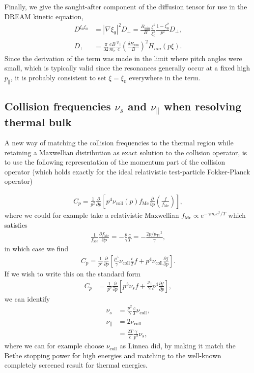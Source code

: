 \documentclass[11pt,a4paper]{article}
\newcommand{\sub}[1]{\ensuremath{_{\text{#1}}}}
\begin{document}
Finally, we give the saught-after component of the diffusion tensor for use in the DREAM kinetic equation,
\begin{align}
D^{\xi_0 \xi_0} &= |\nabla \xi_0|^2 D_\perp = \frac{B\sub{min}}{B}\frac{\xi^2}{\xi_0^2} \frac{1-\xi_0^2}{p^2} D_\perp, \nonumber \\
D_\perp &= \frac{\pi}{32}\frac{ eB}{m_e}\frac{v_\parallel}{c} \left(\frac{\delta B_{nm}}{B}\right)^2 H_{nm}(p\xi).
\end{align}
Since the derivation of the term was made in the limit where pitch angles were small, which is typically valid since the resonances generally occur at a fixed high $p_\parallel$, it is probably consistent to set $\xi=\xi_0$ everywhere in the term.


\subsection{Collision frequencies $\nu_s$ and $\nu_\parallel$ when resolving thermal bulk}
A new way of matching the collision frequencies to the thermal region while retaining a Maxwellian distribution as exact solution to the collision operator, is to use the following representation of the momentum part of the collision operator (which holds exactly for the ideal relativistic test-particle Fokker-Planck operator)

\begin{align}
C_p = \frac{1}{p^2}\frac{\partial}{\partial p} \left[ p^4 \nu\sub{coll}(p) f\sub{Me}\frac{\partial}{\partial p}\left(\frac{f}{f\sub{Me}}\right)\right],
\end{align}
where we could for example take a relativistic Maxwellian $f\sub{Me}\propto e^{-\gamma  m_e c^2/T}$ which satisfies 
\begin{align}
\frac{1}{f\sub{Me}}\frac{\partial f\sub{Me}}{\partial p} = -\frac{p}{\gamma}\frac{c}{T} = -\frac{2 p/p\sub{Te}^2}{\gamma}, 
\end{align}
in which case we find
\begin{align}
C_p = \frac{1}{p^2}\frac{\partial}{\partial p} \left[ \frac{p^5}{\gamma}\nu\sub{coll} \frac{c}{T} f  + p^4 \nu\sub{coll} \frac{\partial f}{\partial p}\right].
\end{align}
If we wish to write this on the standard form
\begin{align}
C_p &=\frac{1}{p^2}\frac{\partial}{\partial p} \left[ p^3\nu_s f + \frac{\nu_\parallel}{2}p^4\frac{\partial f}{\partial p}\right],
\end{align}
we can identify
\begin{align}
\nu_s &= \frac{p^2}{\gamma} \frac{c}{T}\nu\sub{coll}, \nonumber \\
\nu_\parallel &= 2\nu\sub{coll} \nonumber \\
&= \frac{2T}{c}\frac{\gamma}{p^2}\nu_s,
\end{align}
where we can for example choose $\nu\sub{coll}$ as Linnea did, by making it match the Bethe stopping power for high energies and matching to the well-known completely screened result for thermal energies.
\end{document}
